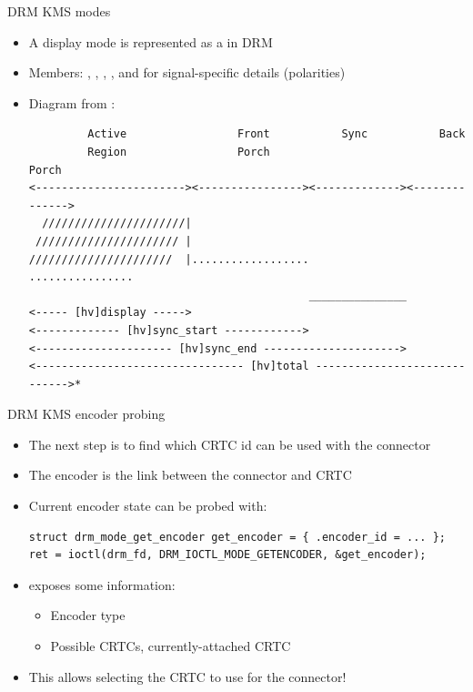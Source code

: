 \begin{frame}[fragile]{DRM KMS modes}
  \begin{itemize}
  \item A display mode is represented as a  in DRM
  \item Members: , , , ,  and  for signal-specific details (polarities)
  \item Diagram from :
  \begin{verbatim}
         Active                 Front           Sync           Back
         Region                 Porch                          Porch
<-----------------------><----------------><-------------><-------------->
  //////////////////////|
 ////////////////////// |
//////////////////////  |..................               ................
                                           _______________
<----- [hv]display ----->
<------------- [hv]sync_start ------------>
<--------------------- [hv]sync_end --------------------->
<-------------------------------- [hv]total ----------------------------->*
  \end{verbatim}
  \end{itemize}
\end{frame}

\begin{frame}[fragile]{DRM KMS encoder probing}
  \begin{itemize}
  \item The next step is to find which CRTC id can be used with the connector
  \item The encoder is the link between the connector and CRTC
  \item Current encoder state can be probed with:
  \begin{verbatim}
struct drm_mode_get_encoder get_encoder = { .encoder_id = ... };
ret = ioctl(drm_fd, DRM_IOCTL_MODE_GETENCODER, &get_encoder);
  \end{verbatim}
  \item {} exposes some information:
    \begin{itemize}
    \item Encoder type
    \item Possible CRTCs, currently-attached CRTC
    \end{itemize}
  \item This allows selecting the CRTC to use for the connector!
  \end{itemize}
\end{frame}


